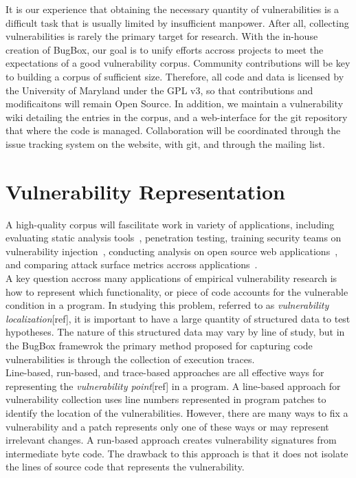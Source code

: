 \documentclass[letterpaper,twocolumn,10pt]{article}
\begin{document}
It is our experience that obtaining the necessary quantity of vulnerabilities is a difficult task that is usually limited by insufficient manpower. After all, collecting vulnerabilities is rarely the primary target for research. With the in-house creation of BugBox, our goal is to unify efforts accross projects to meet the expectations of a good vulnerability corpus. Community contributions will be key to building a corpus of sufficient size. Therefore, all code and data is licensed by the University of Maryland under the GPL v3, so that contributions and modificaitons will remain Open Source. In addition, we maintain a vulnerability wiki detailing the entries in the corpus, and a web-interface for the git repository that where the code is managed. Collaboration will be coordinated through the issue tracking system on the website, with git, and through the mailing list. \\

\section{Vulnerability Representation}

A high-quality corpus will fascilitate work in variety of applications, including evaluating static analysis tools~\cite{Zitser:2004:TSA:1041685.1029911}, penetration testing, training security teams on vulnerability injection~\cite{4725309}, conducting analysis on open source web applications~\cite{DBLP:journals/ese/HuynhM10}, and comparing attack surface metrics accross applications~\cite{Stuckman:2012:CAA:2372225.2372229}. \\

A key question accross many applications of empirical vulnerability research is how to represent which functionality, or piece of code accounts for the vulnerable condition in a program. In studying this problem, referred to as \emph{vulnerability localization}[ref], it is important to have a large quantity of structured data to test hypotheses. The nature of this structured data may vary by line of study, but in the BugBox framewrok the primary method proposed for capturing code vulnerabilities is through the collection of execution traces. \\
 
Line-based, run-based, and trace-based approaches are all effective ways for representing the \emph{vulnerability point}[ref] in a program.   A line-based\cite{4630094} approach for vulnerability collection uses line numbers represented in program patches to identify the location of the vulnerabilities.  However, there are many ways to fix a vulnerability and a patch represents only one of these ways or may represent irrelevant changes.  A run-based\cite{Song:2008:BNA:1496255.1496257} approach creates vulnerability signatures from intermediate byte code.  The drawback to this approach is that it does not isolate the lines of source code that represents the vulnerability. 
\end{document}
